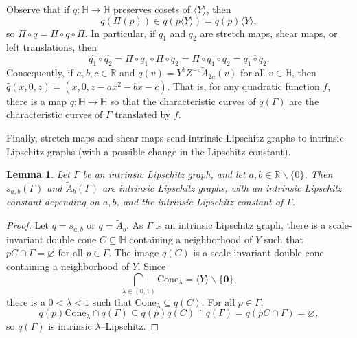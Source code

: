 \documentclass[11pt,reqno]{amsart}
\renewcommand{\H}{\mathbb{H}}
\newcommand{\R}{\mathbb{R}}
\newcommand{\0}{\mathbf{0}}
\renewcommand{\1}{\mathbf 1}
\newcommand{\from}{\colon}
\renewcommand{\subset}{\subseteq}
\renewcommand{\setminus}{\smallsetminus}
\renewcommand{\emptyset}{\varnothing}
\newtheorem{lemma}[thm]{Lemma}
\theoremstyle{remark}
\begin{document}
Observe that if $q\from \H \to \H$ preserves cosets of $\langle Y\rangle$, then
\begin{equation}\label{eq:preserve-cosets}
  q(\Pi(p))\in q(p \langle Y \rangle) = q(p) \langle Y \rangle,
\end{equation}
so $\Pi \circ q =\Pi \circ q\circ \Pi$. In particular, if $q_1$ and $q_2$ are stretch maps, shear maps, or left translations, then
$$\hat{q_1}\circ \hat{q_2} = \Pi \circ q_1\circ \Pi \circ q_2 = \Pi\circ q_1\circ q_2= \widehat{q_1\circ q_2}.$$
Consequently, if $a,b,c\in \R$ and $q(v)=Y^{b} Z^{-c} \tilde{A}_{2a}(v)$ for all $v\in \H$, then $\hat{q}(x,0,z)=(x,0,z - ax^2-bx-c)$.  That is, for any quadratic function $f$, there is a map $q\from \H\to \H$ so that the characteristic curves of $q(\Gamma)$ are the characteristic curves of $\Gamma$ translated by $f$.  %



Finally, stretch maps and shear maps send intrinsic Lipschitz graphs to intrinsic Lipschitz graphs (with a possible change in the Lipschitz constant).
\begin{lemma}\label{lem:automs preserve intrinsic lipschitz}
  Let $\Gamma$ be an intrinsic Lipschitz graph, and let $a,b\in \R\setminus \{0\}$.  Then $s_{a,b}(\Gamma)$ and $\tilde{A}_b(\Gamma)$ are intrinsic Lipschitz graphs, with an intrinsic Lipschitz constant depending on $a,b$, and the intrinsic Lipschitz constant of $\Gamma$.
\end{lemma}
\begin{proof}
  Let $q=s_{a,b}$ or $q=\tilde{A}_b$.  As $\Gamma$ is an intrinsic Lipschitz graph, there is a scale-invariant double cone $C\subset \H$ containing a neighborhood of $Y$ such that $pC\cap \Gamma=\emptyset$ for all $p\in \Gamma$.  The image $q(C)$ is a scale-invariant double cone containing a neighborhood of $Y$. Since
  $$\bigcap_{\lambda\in (0,1)} \mathrm{Cone}_\lambda = \langle Y\rangle\setminus \{\0\},$$ there is a $0<\lambda<1$ such that $\mathrm{Cone}_\lambda\subset q(C)$. For all $p\in \Gamma$,
  $$q(p) \mathrm{Cone}_\lambda \cap q(\Gamma) \subset q(p)q(C) \cap q(\Gamma)=q(pC\cap \Gamma)=\emptyset,$$
  so $q(\Gamma)$ is intrinsic $\lambda$--Lipschitz.
\end{proof}
\end{document}
